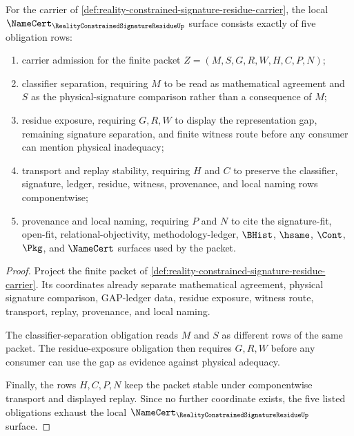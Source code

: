 \begin{theorem}
\label{thm:reality-constrained-signature-residue-namecert-obligations}
For the carrier of \autoref{def:reality-constrained-signature-residue-carrier}, the local $\NameCert_{\RealityConstrainedSignatureResidueUp}$ surface consists exactly of five obligation rows:
\begin{enumerate}
\item carrier admission for the finite packet $Z=(M,S,G,R,W,H,C,P,N)$;
\item classifier separation, requiring $M$ to be read as mathematical agreement and $S$ as the physical-signature comparison rather than a consequence of $M$;
\item residue exposure, requiring $G,R,W$ to display the representation gap, remaining signature separation, and finite witness route before any consumer can mention physical inadequacy;
\item transport and replay stability, requiring $H$ and $C$ to preserve the classifier, signature, ledger, residue, witness, provenance, and local naming rows componentwise;
\item provenance and local naming, requiring $P$ and $N$ to cite the signature-fit, open-fit, relational-objectivity, methodology-ledger, $\BHist$, $\hsame$, $\Cont$, $\Pkg$, and $\NameCert$ surfaces used by the packet.
\end{enumerate}
\end{theorem}
\begin{proof}
Project the finite packet of \autoref{def:reality-constrained-signature-residue-carrier}. Its coordinates already separate mathematical agreement, physical signature comparison, GAP-ledger data, residue exposure, witness route, transport, replay, provenance, and local naming.

The classifier-separation obligation reads $M$ and $S$ as different rows of the same packet. The residue-exposure obligation then requires $G,R,W$ before any consumer can use the gap as evidence against physical adequacy.

Finally, the rows $H,C,P,N$ keep the packet stable under componentwise transport and displayed replay. Since no further coordinate exists, the five listed obligations exhaust the local $\NameCert_{\RealityConstrainedSignatureResidueUp}$ surface.
\end{proof}

